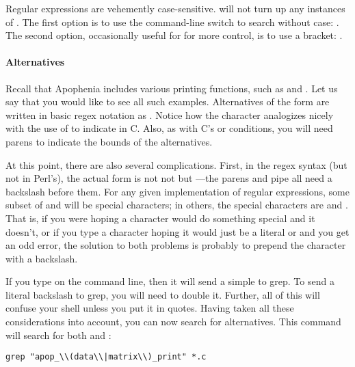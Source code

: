 Regular expressions are vehemently case-sensitive.  will not turn up any instances of . The first
option is to use the  command-line switch to search without case:
. The second option, occasionally useful
for for more control, is to use a bracket: .

\paragraph{Alternatives} 
Recall that Apophenia includes various printing functions, such as
 and . Let us say that you
would like to see all such examples. Alternatives of the form  are written in basic regex notation as . Notice how the
\ci{|} character analogizes nicely with the use of \ci{||} 
to indicate  in C. Also, as with C's  or 
conditions, you will need parens to indicate the bounds of the
alternatives.

At this point, there are also several complications. First, in the
 regex syntax (but not in Perl's), the actual form is not
not  but ---the
parens and pipe all need a backslash before them. For any given
implementation of regular expressions, some subset of 
and \ci{\}} will be special characters; in others, the special characters are
 and \ci{\textbs\}}.
That is, if you were hoping a character would do something special and it
doesn't,  or if you type a character hoping
it would just be a literal \ci{+} or \ci{|} and you get an odd error,
the solution to both problems is probably to prepend the character with a backslash.

If you type \ci{$\backslash$|} on the command line, then it will send a
simple \ci{|} to grep. To send a literal backslash to grep, you will
need to double it. Further, all of this will confuse your shell unless
you put it in quotes. Having taken all these considerations into
account, you can now search for alternatives. This command will search
for both  and :
\begin{lstlisting}
grep "apop_\\(data\\|matrix\\)_print" *.c
\end{lstlisting}

